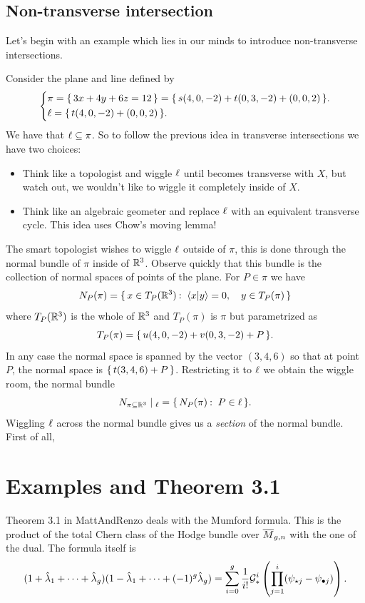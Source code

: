 \documentclass[12pt]{memoir}
\begin{document}
\subsection{Non-transverse intersection}

Let's begin with an example which lies in our minds to introduce non-transverse intersections. 

\begin{Ex}
    Consider the plane and line defined by 
    $$
    \left\lbrace
    \begin{aligned}
    &\pi=\{\,3x+4y+6z=12\,\}=\{\,s(4,0,-2)+t(0,3,-2)+(0,0,2)\,\}.\\
    &\ell=\{\,t(4,0,-2)+(0,0,2)\,\}.
    \end{aligned}
    \right.
    $$
    We have that $\ell\subseteq\pi$. So to follow the previous idea in transverse intersections we have two choices:
    \begin{itemize}
        \item Think like a topologist and wiggle $\ell$ until becomes transverse with $X$, but watch out, we wouldn't like to wiggle it completely inside of $X$.
        \item Think like an algebraic geometer and replace $\ell$ with an equivalent transverse cycle. This idea uses Chow's moving lemma!
    \end{itemize}
    The smart topologist wishes to wiggle $\ell$ outside of $\pi$, this is done through the normal bundle of $\pi$ inside of $\mathbb{R}^3$. Observe quickly that this bundle is the collection of normal spaces of points of the plane. For $P\in\pi$ we have
    $$N_P(\pi)=\set{x\in T_P(\bR^3)\:\ \braket{x}{y}=0,\quad y\in T_P(\pi)}$$
    where $T_P(\mathbb{R}^3)$ is the whole of $\mathbb{R}^3$ and $T_P(\pi)$ is $\pi$ but parametrized as 
    $$T_P(\pi)=\{\,u(4,0,-2)+v(0,3,-2)+P\,\}.$$
    In any case the normal space is spanned by the vector $(3,4,6)$ so that at point $P$, the normal space is $\{\,t(3,4,6)+P\,\}$. Restricting it to $\ell$ we obtain the wiggle room, the normal bundle 
    $$N_{\pi\subseteq\bR^3}\mid_{\l}=\set{N_P(\pi)\:\ P\in\l}.$$
    Wiggling $\ell$ across the normal bundle gives us a \emph{section} of the normal bundle. First of all, 
\end{Ex}


\section{Examples and Theorem 3.1}

Theorem 3.1 in MattAndRenzo deals with the Mumford formula. This is the product of the total Chern class of the Hodge bundle over $\overline{M}_{g,n}$ with the one of the dual. The formula itself is 
$$(1+\hat{\lambda}_1+\dots+\hat{\lambda}_g)(1-\hat{\lambda}_1+\dots+(-1)^g\hat{\lambda}_g)=\sum_{i=0}^g\frac{1}{i!}\mathcal{G}_\ast^i\left(\prod_{j=1}^i(\psi_{\star j}-\psi_{\bullet j})\right).$$
\end{document}
